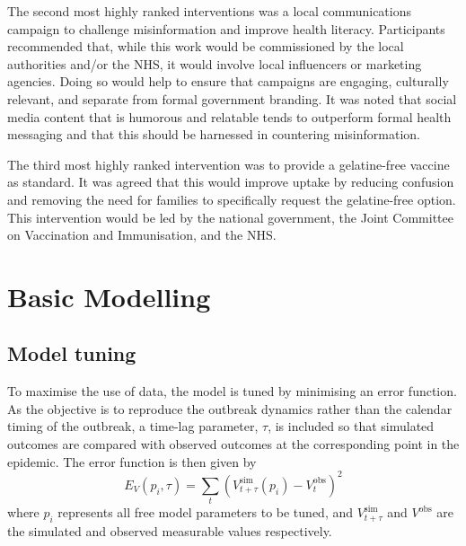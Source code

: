 \documentclass{article}
\begin{document}
The second most highly ranked interventions was a local communications campaign to challenge misinformation and improve health literacy. Participants recommended that, while this work would be commissioned by the local authorities and/or the NHS, it would involve local influencers or marketing agencies. Doing so would help to ensure that campaigns are engaging, culturally relevant, and separate from formal government branding. It was noted that social media content that is humorous and relatable tends to outperform formal health messaging and that this should be harnessed in countering misinformation.  

The third most highly ranked intervention was to provide a gelatine-free vaccine as standard. It was agreed that this would improve uptake by reducing confusion and removing the need for families to specifically request the gelatine-free option. This intervention would be led by the national government, the Joint Committee on Vaccination and Immunisation, and the NHS. 



\section{Basic Modelling}

\subsection{Model tuning}
\label{sec:tuning}
To maximise the use of data, the model is tuned by minimising an error function. As the objective is to reproduce the outbreak dynamics rather than the calendar timing of the outbreak, a time-lag parameter, $\tau$, is included so that simulated outcomes are compared with observed outcomes at the corresponding point in the epidemic. The error function is then given by
%
\begin{equation}
    E_V(p_i, \tau) = \sum_t\left( V_{t+\tau}^{\text{sim}}(p_i) - V_t^{\text{obs}}\right)^2 
    \label{eq:error}
\end{equation}
%
where $p_i$ represents all free model parameters to be tuned, and $V_{t+\tau}^{\text{sim}}$ and $V^{\text{obs}}$ are the simulated and observed measurable values respectively. 
\end{document}
